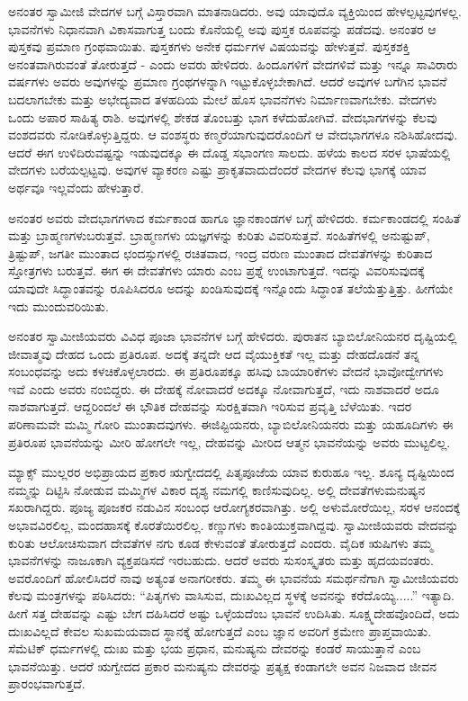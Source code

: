 ಅನಂತರ ಸ್ವಾಮೀಜಿ ವೇದಗಳ ಬಗ್ಗೆ ವಿಸ್ತಾರವಾಗಿ ಮಾತನಾಡಿದರು. ಅವು ಯಾವುದೊ ವ್ಯಕ್ತಿಯಿಂದ ಹೇಳಲ್ಪಟ್ಟವುಗಳಲ್ಲ. ಭಾವನೆಗಳು ನಿಧಾನವಾಗಿ ವಿಕಾಸವಾಗುತ್ತ ಬಂದು ಕೊನೆಯಲ್ಲಿ ಅವು ಪುಸ್ತಕ ರೂಪವನ್ನು ಪಡೆದವು. ಅನಂತರ ಆ ಪುಸ್ತಕವು ಪ್ರಮಾಣ ಗ್ರಂಥವಾಯಿತು. ಪುಸ್ತಕಗಳು ಅನೇಕ ಧರ್ಮಗಳ ವಿಷಯವನ್ನು ಹೇಳುತ್ತವೆ. ಪುಸ್ತಕಶಕ್ತಿ ಅನಂತವಾಗಿರುವಂತೆ ತೋರುತ್ತದೆ - ಎಂದು ಅವರು ಹೇಳಿದರು. ಹಿಂದೂಗಳಿಗೆ ವೇದಗಳಿವೆ ಮತ್ತು ಇನ್ನೂ ಸಾವಿರಾರು ವರ್ಷಗಳು ಅವರು ಅವುಗಳನ್ನು ಪ್ರಮಾಣ ಗ್ರಂಥಗಳನ್ನಾಗಿ ಇಟ್ಟುಕೊಳ್ಳಬೇಕಾಗಿದೆ. ಆದರೆ ಅವುಗಳ ಬಗೆಗಿನ ಭಾವನೆ ಬದಲಾಗಬೇಕು ಮತ್ತು ಅಭೇದ್ಯವಾದ ತಳಹದಿಯ ಮೇಲೆ ಹೊಸ ಭಾವನೆಗಳು ನಿರ್ಮಾಣವಾಗಬೇಕು. ವೇದಗಳು ಒಂದು ಅಪಾರ ಸಾಹಿತ್ಯ ರಾಶಿ. ಅವುಗಳಲ್ಲಿ ಶೇಕಡ ತೊಂಬತ್ತು ಭಾಗ ಕಳೆದುಹೋಗಿವೆ. ವೇದಭಾಗಗಳನ್ನು ಕೆಲವು ವಂಶದವರು ನೋಡಿಕೊಳ್ಳುತ್ತಿದ್ದರು. ಆ ವಂಶಸ್ಥರು ಕಣ್ಮರೆಯಾಗುವುದರೊಂದಿಗೆ ಆ ವೇದಭಾಗಗಳೂ ನಶಿಸಿಹೋದವು. ಆದರೆ ಈಗ ಉಳಿದಿರುವಷ್ಟನ್ನು ಇಡುವುದಕ್ಕೂ ಈ ದೊಡ್ಡ ಸಭಾಂಗಣ ಸಾಲದು. ಹಳೆಯ ಕಾಲದ ಸರಳ ಭಾಷೆಯಲ್ಲಿ ವೇದಗಳು ಬರೆಯಲ್ಪಟ್ಟವು. ಅವುಗಳ ವ್ಯಾಕರಣ ಎಷ್ಟು ಪ್ರಾಕೃತವಾದುದೆಂದರೆ ವೇದಗಳ ಕೆಲವು ಭಾಗಕ್ಕೆ ಯಾವ ಅರ್ಥವೂ ಇಲ್ಲವೆಂದು ಹೇಳುತ್ತಾರೆ.

ಅನಂತರ ಅವರು ವೇದಭಾಗಗಳಾದ ಕರ್ಮಕಾಂಡ ಹಾಗೂ ಜ್ಞಾನಕಾಂಡಗಳ ಬಗ್ಗೆ ಹೇಳಿದರು. ಕರ್ಮಕಾಂಡದಲ್ಲಿ ಸಂಹಿತೆ ಮತ್ತು ಬ್ರಾಹ್ಮಣಗಳು\break ಬರುತ್ತವೆ. ಬ್ರಾಹ್ಮಣಗಳು ಯಜ್ಞಗಳನ್ನು ಕುರಿತು ವಿವರಿಸುತ್ತವೆ. ಸಂಹಿತೆಗಳಲ್ಲಿ ಅನುಷ್ಟುಪ್​, ತ್ರಿಷ್ಟುಪ್​, ಜಗತೀ ಮುಂತಾದ ಛಂದಸ್ಸುಗಳಲ್ಲಿ ರಚಿತವಾದ, ಇಂದ್ರ ವರುಣ ಮುಂತಾದ ದೇವತೆಗಳನ್ನು ಕುರಿತಾದ ಸ್ತೋತ್ರಗಳು ಬರುತ್ತವೆ. ಈಗ ಈ ದೇವತೆಗಳು ಯಾರು ಎಂಬ ಪ್ರಶ್ನೆ ಉಂಟಾಗುತ್ತದೆ. ಇದನ್ನು ವಿವರಿಸುವುದಕ್ಕೆ ಯಾವುದೇ ಸಿದ್ಧಾಂತವನ್ನು ರೂಪಿಸಿದರೂ ಅದನ್ನು ಖಂಡಿಸುವುದಕ್ಕೆ ಇನ್ನೊಂದು ಸಿದ್ಧಾಂತ ತಲೆಯೆತ್ತುತ್ತಿತ್ತು. ಹೀಗೆಯೇ ಇದು ಮುಂದುವರಿಯಿತು.

ಅನಂತರ ಸ್ವಾಮೀಜಿಯವರು ವಿವಿಧ ಪೂಜಾ ಭಾವನೆಗಳ ಬಗ್ಗೆ ಹೇಳಿದರು. ಪುರಾತನ ಬ್ಯಾಬಿಲೋನಿಯನರ ದೃಷ್ಟಿಯಲ್ಲಿ ಜೀವಾತ್ಮವು ದೇಹದ ಒಂದು ಪ್ರತಿರೂಪ. ಅದಕ್ಕೆ ತನ್ನದೇ ಆದ ವೈಯುಕ್ತಿಕತೆ ಇಲ್ಲ ಮತ್ತು ದೇಹದೊಡನೆ ತನ್ನ ಸಂಬಂಧವನ್ನು ಅದು ಕಳಚಿಕೊಳ್ಳಲಾರದು. ಈ ಪ್ರತಿರೂಪಕ್ಕೂ ಹಸಿವು ಬಾಯಾರಿಕೆಗಳು ವೇದನೆ ಭಾವೋದ್ವೇಗಗಳು ಇವೆ ಎಂದು ಅವರು ನಂಬಿದ್ದರು. ಈ ದೇಹಕ್ಕೆ ನೋವಾದರೆ ಅದಕ್ಕೂ ನೋವಾಗುತ್ತದೆ, ಇದು ನಾಶವಾದರೆ ಅದೂ ನಾಶವಾಗುತ್ತದೆ. ಆದ್ದರಿಂದಲೆ ಈ ಭೌತಿಕ ದೇಹವನ್ನು ಸುರಕ್ಷಿತವಾಗಿ ಇರಿಸುವ ಪ್ರವೃತ್ತಿ ಬೆಳೆಯಿತು. ಇದರ ಪರಿಣಾಮವೇ ಮಮ್ಮಿ ಗೋರಿ ಮುಂತಾದವುಗಳು. ಈಜಿಪ್ಟಿಯನರು, ಬ್ಯಾಬಿಲೋನಿಯನರು ಮತ್ತು ಯಹೂದಿಗಳು ಈ ಪ್ರತಿರೂಪ ಭಾವನೆಯನ್ನು ಮೀರಿ ಹೋಗಲೇ ಇಲ್ಲ, ದೇಹವನ್ನು ಮೀರಿದ ಆತ್ಮನ ಭಾವನೆಯನ್ನು ಅವರು ಮುಟ್ಟಲಿಲ್ಲ.

ಮ್ಯಾಕ್ಸ್ ಮುಲ್ಲರರ ಅಭಿಪ್ರಾಯದ ಪ್ರಕಾರ ಋಗ್ವೇದದಲ್ಲಿ ಪಿತೃಪೂಜೆಯ ಯಾವ ಕುರುಹೂ ಇಲ್ಲ. ಶೂನ್ಯ ದೃಷ್ಟಿಯಿಂದ ನಮ್ಮನ್ನು ದಿಟ್ಟಿಸಿ ನೋಡುವ ಮಮ್ಮಿಗಳ ವಿಕಾರ ದೃಶ್ಯ ನಮಗಲ್ಲಿ ಕಾಣಿಸುವುದಿಲ್ಲ. ಅಲ್ಲಿ ದೇವತೆಗಳು\break ಮನುಷ್ಯನ ಸಖರಾಗಿದ್ದರು. ಪೂಜ್ಯ ಪೂಜಕರ ನಡುವಿನ ಸಂಬಂಧ ಆರೋಗ್ಯಕರವಾಗಿತ್ತು. ಅಲ್ಲಿ ಅಳುಮೋರೆಯಿಲ್ಲ, ಸರಳ ಆನಂದಕ್ಕೆ ಅಭಾವವಿರಲಿಲ್ಲ, ಮಂದಹಾಸಕ್ಕೆ ಕೊರತೆಯಿರಲಿಲ್ಲ. ಕಣ್ಣುಗಳು ಕಾಂತಿಯುಕ್ತವಾಗಿದ್ದವು. ಸ್ವಾಮೀಜಿಯವರು ವೇದವನ್ನು ಕುರಿತು ಆಲೋಚಿಸುವಾಗ ದೇವತೆಗಳ ನಗು ಕೂಡ ಕೇಳುವಂತೆ ತೋರುತ್ತದೆ ಎಂದರು. ವೈದಿಕ ಋಷಿಗಳು ತಮ್ಮ ಭಾವನೆಗಳನ್ನು ನಾಜೂಕಾಗಿ ವ್ಯಕ್ತಪಡಿಸದೆ ಇರಬಹುದು. ಆದರೆ ಅವರು ಸುಸಂಸ್ಕೃತರು ಮತ್ತು ಹೃದಯವಂತರು. ಅವರೊಂದಿಗೆ ಹೋಲಿಸಿದರೆ ನಾವು ಅತ್ಯಂತ ಅನಾಗರೀಕರು. ತಮ್ಮ ಈ ಭಾವನೆಯ ಸಮರ್ಥನೆಗಾಗಿ ಸ್ವಾಮೀಜಿಯವರು ಕೆಲವು ಮಂತ್ರಗಳನ್ನು ಪಠಿಸಿದರು: “ಪಿತೃಗಳು ವಾಸಿಸುವ, ದುಃಖವಿಲ್ಲದ ಸ್ಥಳಕ್ಕೆ ಅವನನ್ನು ಕರೆದೊಯ್ಯಿ.....” ಇತ್ಯಾದಿ. ಹೀಗೆ ಸತ್ತ ದೇಹವನ್ನು ಎಷ್ಟು ಬೇಗ ದಹಿಸಿದರೆ ಅಷ್ಟು ಒಳ್ಳೆಯದೆಂಬ ಭಾವನೆ ಉದಿಸಿತು. ಸೂಕ್ಷ್ಮದೇಹವೊಂದಿದೆ, ಅದು ದುಃಖವಿಲ್ಲದೆ ಕೇವಲ ಸುಖಮಯವಾದ ಸ್ಥಾನಕ್ಕೆ ಹೋಗುತ್ತದೆ ಎಂಬ ಜ್ಞಾನ ಅವರಿಗೆ ಕ್ರಮೇಣ ಪ್ರಾಪ್ತವಾಯಿತು. ಸೆಮೆಟಿಕ್​ ಧರ್ಮಗಳಲ್ಲಿ ದುಃಖ ಮತ್ತು ಭಯ ಪ್ರಧಾನ, ಮನುಷ್ಯನು ದೇವರನ್ನು ಕಂಡರೆ ಸಾಯುತ್ತಾನೆ ಎಂಬ ಭಾವನೆಯಿತ್ತು. ಆದರೆ ಋಗ್ವೇದದ ಪ್ರಕಾರ ಮನುಷ್ಯನು ದೇವರನ್ನು ಪ್ರತ್ಯಕ್ಷ ಕಂಡಾಗಲೇ ಅವನ ನಿಜವಾದ ಜೀವನ ಪ್ರಾರಂಭವಾಗುತ್ತದೆ.

